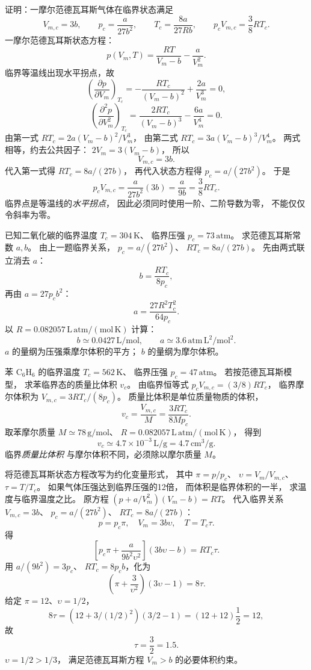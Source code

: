 证明：一摩尔范德瓦耳斯气体在临界状态满足
\[
V_{m,c}=3b,\qquad
p_c=\frac{a}{27b^2},\qquad
T_c=\frac{8a}{27Rb},
\qquad
p_cV_{m,c}=\frac38RT_c.
\]
\exsolution
一摩尔范德瓦耳斯状态方程：
\[
p(V_m,T)=\frac{RT}{V_m-b}-\frac{a}{V_m^2}.
\]
临界等温线出现水平拐点，故
\[
\left(\frac{\partial p}{\partial V_m}\right)_{T_c}
=-\frac{RT_c}{(V_m-b)^2}+\frac{2a}{V_m^3}=0,
\]
\[
\left(\frac{\partial^2p}{\partial V_m^2}\right)_{T_c}
=\frac{2RT_c}{(V_m-b)^3}-\frac{6a}{V_m^4}=0.
\]
由第一式
$RT_c=2a(V_m-b)^2/V_m^3$，
由第二式
$RT_c=3a(V_m-b)^3/V_m^4$。
两式相等，约去公共因子：
$2V_m=3(V_m-b)$，
所以
\[
\boxed{V_{m,c}=3b}.
\]
代入第一式得
$RT_c=8a/(27b)$，
再代入状态方程得
$p_c=a/(27b^2)$。
于是
\[
\boxed{p_cV_{m,c}
=\frac a{27b^2}(3b)
=\frac a{9b}
=\frac38RT_c}.
\]
\excheck 临界点是等温线的\emph{水平拐点}，
因此必须同时使用一阶、二阶导数为零，
不能仅仅令斜率为零。

已知二氧化碳的临界温度
$T_c=304\,\mathrm K$、
临界压强 $p_c=73\,\mathrm{atm}$。
求范德瓦耳斯常数 $a,b$。
\exsolution
由上一题临界关系，
$p_c=a/(27b^2)$、
$RT_c=8a/(27b)$。
先由两式联立消去 $a$：
\[
\boxed{b=\frac{RT_c}{8p_c}},
\]
再由 $a=27p_cb^2$：
\[
\boxed{a=\frac{27R^2T_c^2}{64p_c}}.
\]
以
$R=0.082057\,\mathrm{L\,atm/(mol\,K)}$
计算：
\[
\boxed{b\simeq0.0427\,\mathrm{L/mol}},
\qquad
\boxed{a\simeq3.6\,\mathrm{atm\,L^2/mol^2}}.
\]
\excheck $a$ 的量纲为压强乘摩尔体积的平方；
$b$ 的量纲为摩尔体积。

苯 $\mathrm{C_6H_6}$ 的临界温度
$T_c=562\,\mathrm K$、
临界压强 $p_c=47\,\mathrm{atm}$。
若按范德瓦耳斯模型，
求苯临界态的质量比体积 $v_c$。
\exsolution
由临界恒等式
$p_cV_{m,c}=(3/8)RT_c$，
临界摩尔体积为
$V_{m,c}=3RT_c/(8p_c)$。
质量比体积是单位质量物质的体积，
\[
v_c=\frac{V_{m,c}}M
=\boxed{\frac{3RT_c}{8Mp_c}}.
\]
取苯摩尔质量
$M\simeq78\,\mathrm{g/mol}$、
$R=0.082057\,\mathrm{L\,atm/(mol\,K)}$，
得到
\[
\boxed{v_c\simeq4.7\times10^{-3}\,\mathrm{L/g}
=4.7\,\mathrm{cm^3/g}}.
\]
\excheck 临界\emph{质量比体积}
与摩尔体积不同，必须除以摩尔质量 $M$。

将范德瓦耳斯状态方程改写为约化变量形式，
其中
$\pi=p/p_c$、
$\upsilon=V_m/V_{m,c}$、
$\tau=T/T_c$。
如果气体压强达到临界压强的12倍，
而体积是临界体积的一半，
求温度与临界温度之比。
\exsolution
原方程
$(p+a/V_m^2)(V_m-b)=RT$。
代入临界关系
$V_{m,c}=3b$、
$p_c=a/(27b^2)$、
$RT_c=8a/(27b)$：
\[
p=p_c\pi,\quad V_m=3b\upsilon,\quad T=T_c\tau.
\]
得
\[
\left[p_c\pi+\frac a{9b^2\upsilon^2}\right]
(3b\upsilon-b)=RT_c\tau.
\]
用 $a/(9b^2)=3p_c$、
$RT_c=8p_cb$，化为
\[
\boxed{\left(\pi+\frac3{\upsilon^2}\right)
(3\upsilon-1)=8\tau}.
\]
给定 $\pi=12$、$\upsilon=1/2$，
\[
8\tau=(12+3/(1/2)^2)(3/2-1)
=(12+12)\frac12=12,
\]
故
\[
\boxed{\tau=\frac32=1.5}.
\]
\excheck $\upsilon=1/2>1/3$，
满足范德瓦耳斯方程 $V_m>b$ 的必要体积约束。

